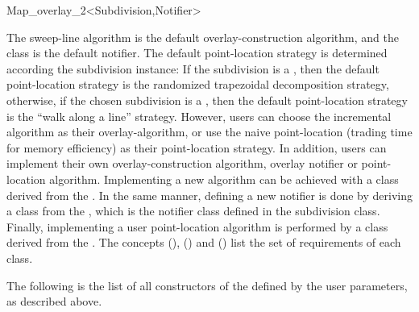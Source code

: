 \begin{ccRefClass}{Map_overlay_2<Subdivision,Notifier>}
\begin{ccAdvanced}
The sweep-line algorithm is the default overlay-construction algorithm,
and the  class is the default notifier.
The default point-location strategy is determined according the 
subdivision instance: If the subdivision is a , 
then the default point-location strategy is the randomized trapezoidal 
decomposition strategy, otherwise,
if the chosen subdivision is a , 
then the default point-location strategy is the ``walk along a line'' 
strategy. 
However, users can choose the incremental algorithm as their 
overlay-algorithm, or use the naive point-location 
(trading time for memory efficiency) as their point-location strategy.
In addition, users can implement their own overlay-construction 
algorithm, overlay notifier or point-location algorithm. 
Implementing a new algorithm can be achieved with a class derived 
from the . 
In the same manner, defining a new notifier is done by deriving a 
class from the , which is the 
notifier class defined in the subdivision class.
Finally, implementing a user point-location algorithm is performed by a 
class derived from the .
The concepts  
(), 
 () and 
 () 
list the set of requirements of each class.

The following is the list of all constructors of the \ccClassTemplateName
defined by the user parameters, as described above.
  
  


  



\end{ccAdvanced}
\end{ccRefClass}
